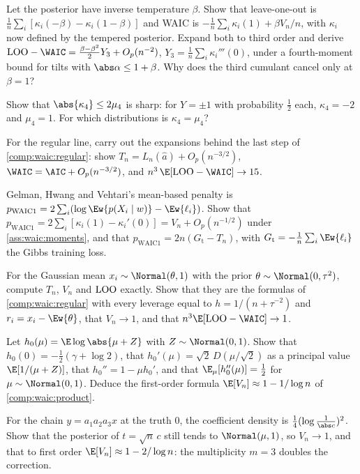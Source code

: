 \begin{refsection}
\begin{exercises}
\item\label{ex:waic:beta}\consolidation Let the posterior have inverse temperature $\beta$. Show that leave-one-out is $\frac1n\sum_i[\kappa_i(-\beta)-\kappa_i(1-\beta)]$ and WAIC is $-\frac1n\sum_i\kappa_i(1)+\beta V_n/n$, with $\kappa_i$ now defined by the tempered posterior. Expand both to third order and derive $\waicLOO-\WAIC=\frac{\beta-\beta^2}2Y_3+O_p(n^{-2})$, $Y_3=\frac1n\sum_i\kappa_i'''(0)$, under a fourth-moment bound for tilts with $\abs\alpha\le1+\beta$. Why does the third cumulant cancel only at $\beta=1$? 
\item\consolidation Show that $\abs{\kappa_4}\le2\mu_4$ is sharp: for $Y=\pm1$ with probability $\tfrac12$ each, $\kappa_4=-2$ and $\mu_4=1$. For which distributions is $\kappa_4=\mu_4$?
\item\consolidation For the regular line, carry out the expansions behind the last step of \cref{comp:waic:regular}: show $T_n=L_n(\hat a)+O_p(n^{-3/2})$, $\WAIC=\AIC+O_p(n^{-3/2})$, and $n^3\,\E[\waicLOO-\WAIC]\to15$.
\item\consolidation Gelman, Hwang and Vehtari's mean-based penalty is $p_{\mathrm{WAIC}1}=2\sum_i(\log\Ew{p(X_i\mid w)}-\Ew{\ell_i})$. Show that $p_{\mathrm{WAIC}1}=2\sum_i[\kappa_i(1)-\kappa_i'(0)]=V_n+O_p(n^{-1/2})$ under \cref{ass:waic:moments}, and that $p_{\mathrm{WAIC}1}=2n(G_{\mathrm t}-T_n)$, with $G_{\mathrm t}=-\frac1n\sum_i\Ew{\ell_i}$ the Gibbs training loss.
\item\byhand For the Gaussian mean $x_i\sim\Normal(\theta,1)$ with the prior $\theta\sim\Normal(0,\tau^2)$, compute $T_n$, $V_n$ and $\mathrm{LOO}$ exactly. Show that they are the formulas of \cref{comp:waic:regular} with every leverage equal to $h=1/(n+\tau^{-2})$ and $r_i=x_i-\Ew{\theta}$, that $V_n\to1$, and that $n^3\E[\waicLOO-\WAIC]\to1$.
\item\label{ex:waic:dawson}\byhand Let $h_0(\mu)=\E\log\abs{\mu+Z}$ with $Z\sim\Normal(0,1)$. Show that $h_0(0)=-\tfrac12(\gamma+\log2)$, that $h_0'(\mu)=\sqrt2\,D(\mu/\sqrt2)$ as a principal value $\E[1/(\mu+Z)]$, that $h_0''=1-\mu h_0'$, and that $\E_\mu[h_0''(\mu)]=\tfrac12$ for $\mu\sim\Normal(0,1)$. Deduce the first-order formula $\E[V_n]\approx1-1/\log n$ of \cref{comp:waic:product}. 
\item\byhand For the chain $y=a_1a_2a_3x$ at the truth $0$, the coefficient density is $\tfrac14(\log\frac1{\abs c})^2$. Show that the posterior of $t=\sqrt n\,c$ still tends to $\Normal(\mu,1)$, so $V_n\to1$, and that to first order $\E[V_n]\approx1-2/\log n$: the multiplicity $m=3$ doubles the correction.

\end{exercises}
\end{refsection}
